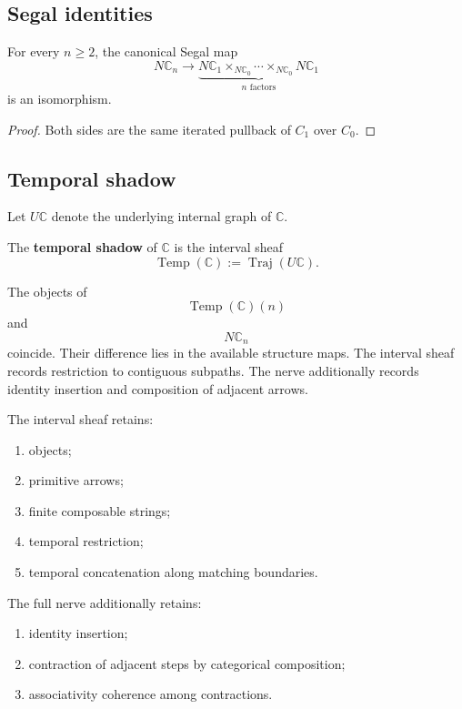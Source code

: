 \subsection{Segal identities}
\label{subsec:segal-identities}

\begin{proposition}
\label{prop:internal-category-segal-isomorphisms}
For every \(n\geq 2\), the canonical Segal map
\[
    N\mathbb C_n
    \longrightarrow
    \underbrace{
    N\mathbb C_1
    \times_{N\mathbb C_0}\cdots
    \times_{N\mathbb C_0}
    N\mathbb C_1
    }_{n\text{ factors}}
\]
is an isomorphism.
\end{proposition}

\begin{proof}
Both sides are the same iterated pullback of \(C_1\) over \(C_0\).
\end{proof}

\subsection{Temporal shadow}
\label{subsec:temporal-shadow-nerve}

Let \(U\mathbb C\) denote the underlying internal graph of \(\mathbb C\).

\begin{definition}
\label{def:temporal-shadow}
The \textbf{temporal shadow} of \(\mathbb C\) is the interval sheaf
\[
    \operatorname{Temp}(\mathbb C)
    :=
    \operatorname{Traj}(U\mathbb C).
\]
\end{definition}

The objects of
\[
    \operatorname{Temp}(\mathbb C)(n)
\]
and
\[
    N\mathbb C_n
\]
coincide. Their difference lies in the available structure maps. The
interval sheaf records restriction to contiguous subpaths. The nerve
additionally records identity insertion and composition of adjacent arrows.

\begin{remark}
\label{rem:information-segal-enhancement}
The interval sheaf retains:
\begin{enumerate}
    \item objects;
    \item primitive arrows;
    \item finite composable strings;
    \item temporal restriction;
    \item temporal concatenation along matching boundaries.
\end{enumerate}
The full nerve additionally retains:
\begin{enumerate}
    \item identity insertion;
    \item contraction of adjacent steps by categorical composition;
    \item associativity coherence among contractions.
\end{enumerate}
\end{remark}


